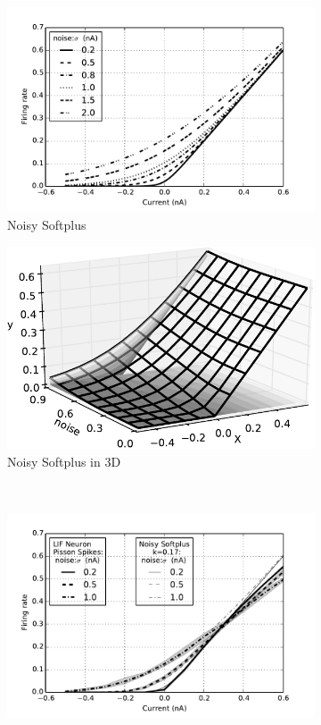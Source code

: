 	\begin{figure}[htb!]
		\centering
		\begin{subfigure}[t]{0.4\textwidth}
			\includegraphics[width=\textwidth]{pics_iconip/4.pdf}
		    \caption{Noisy Softplus}
		    \label{Fig:nsp}
		\end{subfigure}
		\begin{subfigure}[t]{0.4\textwidth}
			\includegraphics[width=\textwidth]{pics_iconip/5.pdf}
		    \caption{Noisy Softplus in 3D}
		    \label{Fig:3d}
		\end{subfigure}
		\\
		\begin{subfigure}[t]{0.4\textwidth}
			\includegraphics[width=\textwidth]{pics_iconip/4-1.pdf}

\end{subfigure}
\end{figure}
